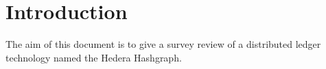 \section{Introduction}
The aim of this document is to give a survey review of a distributed ledger technology named the Hedera Hashgraph.
